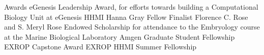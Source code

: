 \begin{rubric}{Awards}
\entry*[2020]
  eGenesis Leadership Award, for efforts towards building a Computational
  Biology Unit at eGenesis
\entry*[2019]
    HHMI Hanna Gray Fellow Finalist
\entry*[2015]
  Florence C. Rose and S. Meryl Rose Endowed Scholarship for attendance to the
  Embryology course at the Marine Biological Laboratory
\entry*[2014]
  Amgen Graduate Student Fellowship
\entry*[2012]
  EXROP Capstone Award
\entry*[2011]
  EXROP HHMI Summer Fellowship

\end{rubric}
